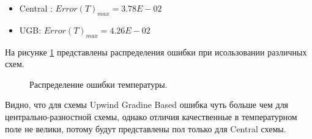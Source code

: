 \begin{itemize}
    \item Central : $Error(T)_{max} = 3.78E-02$
    \item UGB: $Error(T)_{max} = 4.26E-02$
\end{itemize}


На рисунке \ref{fig:04} представлены распределения ошибки при исользовании различных схем. 

\begin{figure}[H]
    \centering
    \caption{Распределение ошибки температуры.}
    \label{fig:04}
\end{figure}

Видно, что для схемы Upwind Gradine Based ошибка чуть больше чем для центрально-разностной схемы, однако отличия качественные в температурном поле не велики, потому будут представлены пол только для Central схемы.

